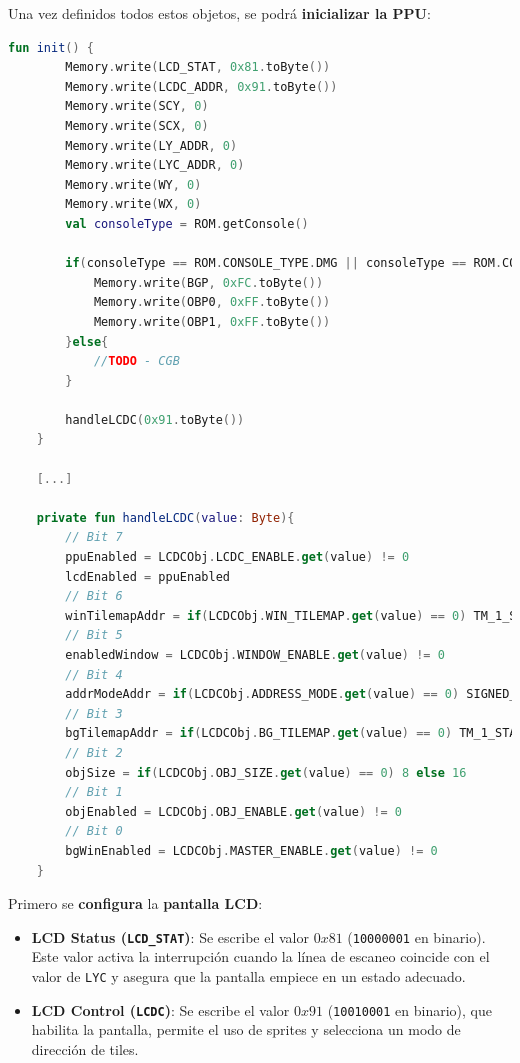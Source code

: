 Una vez definidos todos estos objetos, se podrá \textbf{inicializar la PPU}:\label{handleLCDC}

\begin{lstlisting}[language=Kotlin, caption={Inicialización de la PPU.}, label={code:ppuinit}]
    fun init() {
        Memory.write(LCD_STAT, 0x81.toByte())
        Memory.write(LCDC_ADDR, 0x91.toByte())
        Memory.write(SCY, 0)
        Memory.write(SCX, 0)
        Memory.write(LY_ADDR, 0)
        Memory.write(LYC_ADDR, 0)
        Memory.write(WY, 0)
        Memory.write(WX, 0)
        val consoleType = ROM.getConsole()

        if(consoleType == ROM.CONSOLE_TYPE.DMG || consoleType == ROM.CONSOLE_TYPE.DMG_CGB) {
            Memory.write(BGP, 0xFC.toByte())
            Memory.write(OBP0, 0xFF.toByte())
            Memory.write(OBP1, 0xFF.toByte())
        }else{
            //TODO - CGB
        }

        handleLCDC(0x91.toByte())
    }

    [...]

    private fun handleLCDC(value: Byte){
        // Bit 7
        ppuEnabled = LCDCObj.LCDC_ENABLE.get(value) != 0
        lcdEnabled = ppuEnabled
        // Bit 6
        winTilemapAddr = if(LCDCObj.WIN_TILEMAP.get(value) == 0) TM_1_START else TM_2_START
        // Bit 5
        enabledWindow = LCDCObj.WINDOW_ENABLE.get(value) != 0
        // Bit 4
        addrModeAddr = if(LCDCObj.ADDRESS_MODE.get(value) == 0) SIGNED_TILE_REGION else VRAM_START
        // Bit 3
        bgTilemapAddr = if(LCDCObj.BG_TILEMAP.get(value) == 0) TM_1_START else TM_2_START
        // Bit 2
        objSize = if(LCDCObj.OBJ_SIZE.get(value) == 0) 8 else 16
        // Bit 1
        objEnabled = LCDCObj.OBJ_ENABLE.get(value) != 0
        // Bit 0
        bgWinEnabled = LCDCObj.MASTER_ENABLE.get(value) != 0
    }
\end{lstlisting}

Primero se \textbf{configura} la \textbf{pantalla LCD}:

\begin{itemize}
    \item \textbf{LCD Status (\texttt{LCD\_STAT})}: Se escribe el valor $0x81$ (\texttt{10000001} en binario). Este valor activa la interrupción cuando la línea de escaneo coincide con el valor de \texttt{LYC} y asegura que la pantalla empiece en un estado adecuado.
    \item \textbf{LCD Control (\texttt{LCDC})}: Se escribe el valor $0x91$ (\texttt{10010001} en binario), que habilita la pantalla, permite el uso de sprites y selecciona un modo de dirección de tiles.
\end{itemize}

